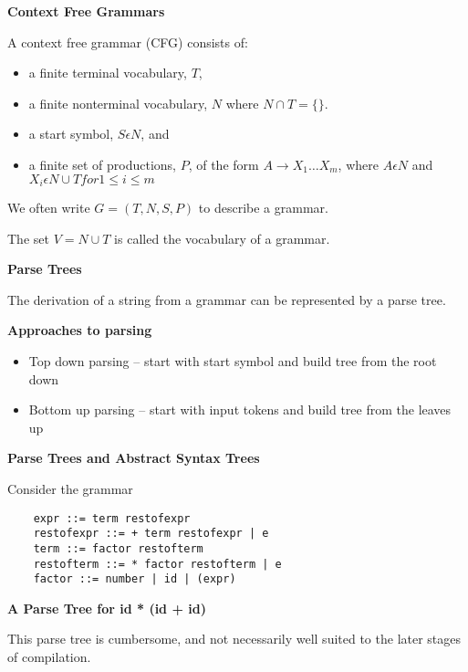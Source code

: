 %
%
\begin{slide}{}
{\bf Context Free Grammars}

A context free grammar (CFG) consists of:
\begin{itemize}
\item a finite terminal vocabulary, $T$,
\item a finite nonterminal vocabulary, $N$ where
      $N \cap T = \{\}$.
\item a start symbol, $S \epsilon N$, and
\item a finite set of productions, $P$, of the form
      $A \rightarrow X_1 \ldots X_m$, where $A \epsilon N$ and
      $X_i \epsilon N \cup T for 1 \leq i \leq m$
\end{itemize}

We often write $G = (T,N,S,P)$ to describe a grammar.

The set $V = N \cup T$ is called the vocabulary of a grammar.
\end{slide}
%
%
\begin{slide}{}
{\bf Parse Trees}

The derivation of a string from a grammar can be
represented by a parse tree.

\vspace{3ex}

\end{slide}
%
%
\begin{slide}{}
{\bf Approaches to parsing} 
\begin{itemize}
\item Top down parsing -- start with start symbol and build
tree from the root down
\item Bottom up parsing -- start with input tokens and build tree
from the leaves up
\end{itemize}
\end{slide}
%
%
\begin{slide}{}
{\bf Parse Trees and Abstract Syntax Trees}

Consider the grammar
\begin{verbatim}
    expr ::= term restofexpr
    restofexpr ::= + term restofexpr | e
    term ::= factor restofterm
    restofterm ::= * factor restofterm | e
    factor ::= number | id | (expr)
\end{verbatim}
\end{slide}
%
%
\begin{slide}{}
{\bf A Parse Tree for id * (id + id)}

\vspace{3ex}

This parse tree is cumbersome, and not necessarily well
suited to the later stages of compilation.
\end{slide}
